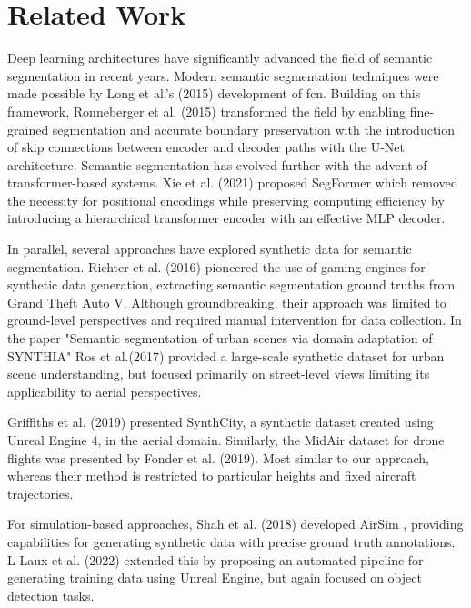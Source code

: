 \documentclass[../report.tex]{subfiles}
\begin{document}
    \section{Related Work}
    \label{sec:related_work}

    Deep learning architectures have significantly advanced the field of semantic segmentation in recent years. Modern semantic segmentation techniques were made possible by Long et al.'s (2015)\cite{long2015fully} development of \gls{fcn}. Building on this framework, Ronneberger et al. (2015)\cite{ronneberger2015u} transformed the field by enabling fine-grained segmentation and accurate boundary preservation with the introduction of skip connections between encoder and decoder paths with the U-Net architecture. Semantic segmentation has evolved further with the advent of transformer-based systems. Xie et al. (2021)\cite{xie2021segformer} proposed SegFormer which removed the necessity for positional encodings while preserving computing efficiency by introducing a hierarchical transformer encoder with an effective MLP decoder. 

    In parallel, several approaches have explored synthetic data for semantic segmentation. Richter et al. (2016)\cite{richter2016playing} pioneered the use of gaming engines for synthetic data generation, extracting semantic segmentation ground truths from Grand Theft Auto V. Although groundbreaking, their approach was limited to ground-level perspectives and required manual intervention for data collection. In the paper "Semantic segmentation of urban scenes via domain adaptation of SYNTHIA"\cite{ros2017semantic} Ros et al.(2017) provided a large-scale synthetic dataset for urban scene understanding, but focused primarily on street-level views limiting its applicability to aerial perspectives.
    
    Griffiths et al. (2019)\cite{griffiths2019synthcity} presented SynthCity, a synthetic dataset created using Unreal Engine 4, in the aerial domain. Similarly, the MidAir\cite{fonder2019mid} dataset for drone flights was presented by Fonder et al. (2019). Most similar to our approach, whereas their method is restricted to particular heights and fixed aircraft trajectories.

    For simulation-based approaches, Shah et al. (2018) developed AirSim \cite{shah2018airsim}, providing capabilities for generating synthetic data with precise ground truth annotations.
    L Laux et al. (2022)\cite{laux2022build} extended this by proposing an automated pipeline for generating training data using Unreal Engine, but again focused on object detection tasks.
    
\end{document}
